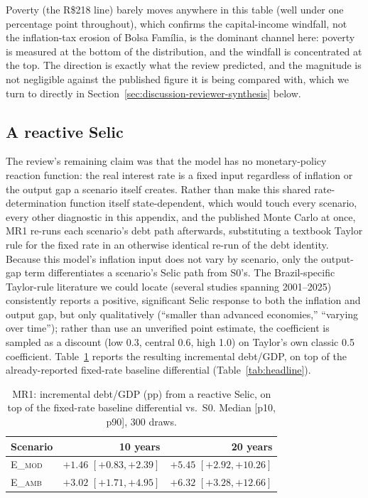 \documentclass[11pt,a4paper]{article}
\begin{document}
Poverty (the R\$218 line) barely moves anywhere in this table (well under one percentage point throughout), which confirms the capital-income windfall, not the inflation-tax erosion of Bolsa Fam\'ilia, is the dominant channel here: poverty is measured at the bottom of the distribution, and the windfall is concentrated at the top. The direction is exactly what the review predicted, and the magnitude is not negligible against the published figure it is being compared with, which we turn to directly in Section~\ref{sec:discussion-reviewer-synthesis} below.

\subsection{A reactive Selic}

The review's remaining claim was that the model has no monetary-policy reaction function: the real interest rate is a fixed input regardless of inflation or the output gap a scenario itself creates. Rather than make this shared rate-determination function itself state-dependent, which would touch every scenario, every other diagnostic in this appendix, and the published Monte Carlo at once, MR1 re-runs each scenario's debt path afterwards, substituting a textbook Taylor rule \citep{taylor1993} for the fixed rate in an otherwise identical re-run of the debt identity. Because this model's inflation input does not vary by scenario, only the output-gap term differentiates a scenario's Selic path from \textsc{S0}'s. The Brazil-specific Taylor-rule literature we could locate (several studies spanning 2001--2025) consistently reports a positive, significant Selic response to both the inflation and output gap, but only qualitatively (``smaller than advanced economies,'' ``varying over time''); rather than use an unverified point estimate, the coefficient is sampled as a discount (low 0.3, central 0.6, high 1.0) on Taylor's own classic 0.5 coefficient. Table~\ref{tab:mr1} reports the resulting incremental debt/GDP, on top of the already-reported fixed-rate baseline differential (Table~\ref{tab:headline}).

\begin{table}[htbp]
\centering\small
\caption{MR1: incremental debt/GDP (pp) from a reactive Selic, on top of the fixed-rate baseline differential vs.\ \textsc{S0}. Median [p10, p90], 300 draws.}
\label{tab:mr1}
\begin{tabular}{lrr}
\toprule
Scenario & 10 years & 20 years \\
\midrule
\textsc{E\_mod} & $+1.46$ $[+0.83,+2.39]$ & $+5.45$ $[+2.92,+10.26]$ \\
\textsc{E\_amb} & $+3.02$ $[+1.71,+4.95]$ & $+6.32$ $[+3.28,+12.66]$ \\
\bottomrule
\end{tabular}
\end{table}
\end{document}
